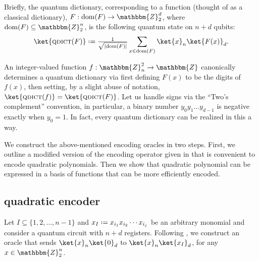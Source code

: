 \documentclass[reqno,oneside,12pt]{amsart}  %
\numberwithin{equation}{section}                %
\let\originalleft\left
\let\originalright\right
\renewcommand{\left}{\mathopen{}\mathclose\bgroup\originalleft}
\renewcommand{\right}{\aftergroup\egroup\originalright}
\def\({\mathopen{}\left(}
\def\){\right)\mathclose{}}
\newcommand*{\eqdef}{\mathrel{\vcenter{\baselineskip0.5ex \lineskiplimit0pt\hbox{.}\hbox{.}}}=}
\def\Z{\mathbbm{Z}}
\def\dom{\mathrm{dom}}
\def\qdict{\textsc{qdict}}
\begin{document}
Briefly, the quantum dictionary, corresponding to a function (thought of as a classical dictionary), $F: \dom \( F \) \rightarrow \Z_2^d$, where $\dom \( F \) \subseteq \Z_2^n$, is the following quantum state on $n + d$ qubits:
\begin{equation}
   \ket{\qdict \( F \)} \eqdef \tfrac{1}{\sqrt{\left| \dom \( F \) \right|}} \sum\limits_{x \in \dom \( F \)} \ket{x}_n \ket{F (x)}_d.
\end{equation}

An integer-valued function $f : \Z_n^2 \rightarrow \Z$ canonically determines a quantum dictionary via first defining $F (x)$ to be the digits of $f (x)$, then setting, by a slight abuse of notation, $\ket{\qdict \( f \)} = \ket{\qdict \( F \)}$. Let us handle signs via the ``Two's complement'' convention, in particular, a binary number $y_0 y_1 \ldots y_{d - 1}$ is negative exactly when $y_0 = 1$. In fact, every quantum dictionary can be realized in this a way.

\smallskip

We construct the above-mentioned encoding oracles in two steps. First, we outline a modified version of the encoding operator given in \cite{gilliam_grover_2021} that is convenient to encode quadratic polynomials. Then we show that quadratic polynomial can be expressed in a basis of functions that can be more efficiently encoded.

\medskip

\subsection{quadratic encoder}
\label{sec:quad}

Let $I \subseteq \{ 1, 2, \ldots, n - 1 \}$ and $x_I \eqdef x_{i_1} x_{i_2} \cdots x_{i_j}$ be an arbitrary monomial and consider a quantum circuit with $n + d$ registers. Following \cite{gilliam_grover_2021}, we construct an oracle that sends $\ket{x}_n \ket{0}_d$ to $\ket{x}_n \ket{x_I}_d$, for any $x \in \Z_2^n$.
\end{document}
